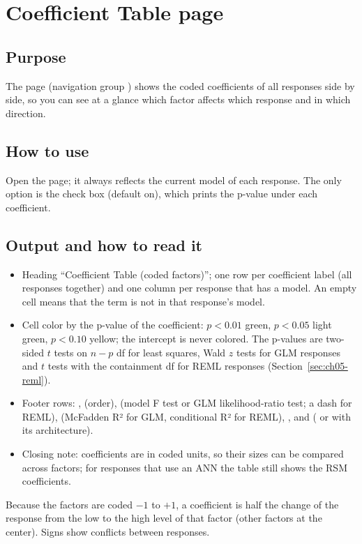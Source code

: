 \section{Coefficient Table page}\label{sec:ch05-coeftable}

\subsection*{Purpose}
The  page (navigation group ) shows the coded coefficients of all
responses side by side, so you can see at a glance which factor affects which response and in which
direction.

\subsection*{How to use}
Open the page; it always reflects the current model of each response. The only option is the check box
 (default on), which prints the p-value under each coefficient.

\subsection*{Output and how to read it}
\begin{itemize}
  \item Heading ``Coefficient Table (coded factors)''; one row per coefficient label (all responses
        together) and one column per response that has a model. An empty cell means that the term is not in
        that response's model.
  \item Cell color by the p-value of the coefficient: $p<0.01$ green, $p<0.05$ light green, $p<0.10$
        yellow; the intercept is never colored. The p-values are two-sided $t$ tests on $n-p$ df for least
        squares, Wald $z$ tests for GLM responses and $t$ tests with the containment df for REML responses
        (Section~\ref{sec:ch05-reml}).
  \item Footer rows: ,  (order),  (model F test or GLM
        likelihood-ratio test; a dash for REML),  (McFadden R² for GLM, conditional R² for REML),
        ,  and  ( or  with its
        architecture).
  \item Closing note: coefficients are in coded units, so their sizes can be compared across factors; for
        responses that use an ANN the table still shows the RSM coefficients.
\end{itemize}
Because the factors are coded $-1$ to $+1$, a coefficient is half the change of the response from the low
to the high level of that factor (other factors at the center). Signs show conflicts between responses.

